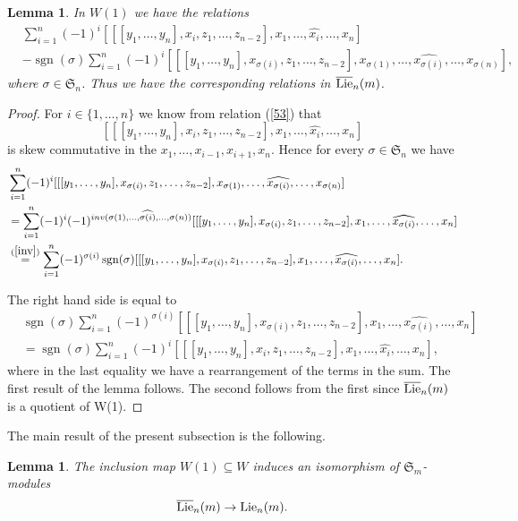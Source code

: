\documentclass[11pt]{amsart}
\newtheorem{lem}[thm]{Lemma}
\theoremstyle{definition}
\numberwithin{equation}{section}
\DeclareMathOperator{\sign}{sgn}
\begin{document}
\begin{lem}\label{finalrel}
In $W(1)$  we have the relations 
\begin{align*}&\sum_{i=1}^n(-1)^i[[[y_1,\dots,y_n],x_i,z_1,\dots, z_{n-2}],x_1,\dots, \widehat{x_i}, \dots, x_n]\\&-\sign(\sigma)\sum_{i=1}^n(-1)^i[[[y_1,\dots,y_n],x_{\sigma(i)},z_1,\dots, z_{n-2}],x_{\sigma(1)},\dots, \widehat{x_{\sigma(i)}}, \dots, x_{\sigma(n)}],
\end{align*} where $\sigma \in \mathfrak{S}_n$. Thus we have the corresponding relations in $\overline{\textup{Lie}}_n(m)$.
\end{lem}
\begin{proof}
	For  $i \in \{1,\dots,n\}$ we know from relation (\ref{53}) that \[[[[y_1,\dots,y_n],x_i,z_1,\dots, z_{n-2}],x_1,\dots, \widehat{x_i}, \dots, x_n]\] is skew commutative in the $x_1, \dots ,x_{i-1}, x_{i+1}, x_n.$ Hence for every $\sigma \in \mathfrak{S}_n$ we have  \begin{align*}
	&\sum_{i=1}^n(-1)^i[[[y_1,\dots,y_n],x_{\sigma(i)},z_1,\dots, z_{n-2}],x_{\sigma(1)},\dots, \widehat{x_{\sigma(i)}}, \dots, x_{\sigma(n)}]\\&=\sum_{i=1}^n(-1)^i(-1)^{{inv(\sigma(1), \dots, \widehat{\sigma(i)}, \dots, \sigma(n))}}[[[y_1,\dots,y_n],x_{\sigma(i)},z_1,\dots, z_{n-2}],x_{1},\dots, \widehat{x_{\sigma(i)}}, \dots, x_{n}]\\&\overset{(\ref{inv})}{=}
	\sum_{i=1}^n(-1)^{\sigma (i)}\sign(\sigma)[[[y_1,\dots,y_n],x_{\sigma(i)},z_1,\dots, z_{n-2}],x_{1},\dots, \widehat{x_{\sigma(i)}}, \dots, x_{n}].
		\end{align*} 

The right hand side is equal to 
\begin{align*}
	&\sign(\sigma)\sum_{i=1}^n(-1)^{\sigma (i)}[[[y_1,\dots,y_n],x_{\sigma(i)},z_1,\dots, z_{n-2}],x_{1},\dots, \widehat{x_{\sigma(i)}}, \dots, x_{n}]\\&=\sign(\sigma)\sum_{i=1}^n(-1)^{i}[[[y_1,\dots,y_n],x_{i},z_1,\dots, z_{n-2}],x_{1},\dots, \widehat{x_{i}}, \dots, x_{n}],
\end{align*}
where in the last equality we have a rearrangement of the terms in the sum. The first result of the lemma follows. The second follows from the first since $\overline{\textup{Lie}}_n(m)$ is a quotient of W(1). \end{proof} The main result of the present subsection is the following.
\begin{lem}\label{presentationlanke} The inclusion map $W(1) \subseteq W$ induces an isomorphism of $\mathfrak{S}_m$-modules \[\overline{\textup{Lie}}_n(m) \to \textup{Lie}_n(m).\]
\end{lem}
\end{document}
